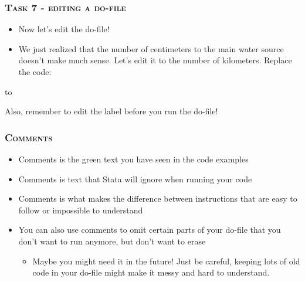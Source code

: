 \documentclass[10pt]{beamer}
\begin{document}
	\begin{frame}
		\frametitle{\textsc{Task 7 - editing a do-file}}
	
		\begin{itemize}
			\item Now let's edit the do-file!
			\item We just realized that the number of centimeters to the main water source doesn't make much sense. Let's edit it to the number of kilometers. Replace the code:
			\end{itemize}
\begin{stlog}\end{stlog}
	to
\begin{stlog}\end{stlog}
	Also, remember to edit the label before you run the do-file!
	\end{frame}
	
	\begin{frame}
		\frametitle{\textsc{Comments}}	
		\begin{itemize}	
			\item Comments is the green text you have seen in the code examples
			\item Comments is text that Stata will ignore when running your code
			\item Comments is what makes the difference between instructions that are easy to follow or impossible to understand
			\item You can also use comments to omit certain parts of your do-file that you don't want to run anymore, but don't want to erase
			\begin{itemize}
				\item Maybe you might need it in the future! Just be careful, keeping lots of old code in your do-file might make it messy and hard to understand.
			\end{itemize}
		\end{itemize}
	\end{frame}
	
\end{document}
